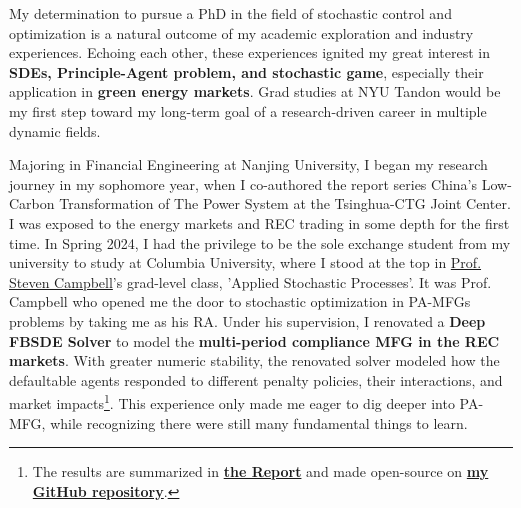 \documentclass[12pt, a4paper]{article}
\newcommand{\Report}{\href{https://github.com/OrangeAoo/Multi-Compliance-MFG-FBSDEs/blob/ca6adb57636c1fc1ff9daea8d57f004e5762fd4d/FinalReports/Report-v3.pdf}{\textbf{the Report}}\xspace}
\newcommand{\GitHubMFG}{\href{https://github.com/OrangeAoo/Multi-Period-Compliance-MFG-FBSDEs}{\textbf{my GitHub repository}}\xspace}
\newcommand{\NJU}{Nanjing University\xspace}
\newcommand{\TCJC}{Tsinghua-CTG Joint Center\xspace}
\newcommand{\CU}{Columbia University\xspace}
\newcommand{\schoolShort}{NYU Tandon\xspace}
\newcommand{\SC}{\href{https://www.stevenacampbell.com/}{Prof. Steven Campbell}\xspace}
\begin{document}


My determination to pursue a PhD in the field of stochastic control and optimization is a natural outcome of my academic exploration and industry experiences. Echoing each other, these experiences ignited my great interest in \textbf{SDEs, Principle-Agent problem, and stochastic game}, especially their application in \textbf{green energy markets}. Grad studies at \schoolShort would be my first step toward my long-term goal of a research-driven career in multiple dynamic fields.

Majoring in Financial Engineering at \NJU, I began my research journey in my sophomore year, when I co-authored the report series China's Low-Carbon Transformation of The Power System at the \TCJC. I was exposed to the energy markets and REC trading in some depth for the first time. In Spring 2024, I had the privilege to be the sole exchange student from my university to study at \CU, where I stood at the top in \SC’s grad-level class, 'Applied Stochastic Processes'. It was Prof. Campbell who opened me the door to stochastic optimization in PA-MFGs problems by taking me as his RA. Under his supervision, I renovated a \textbf{Deep FBSDE Solver} to model the \textbf{multi-period compliance MFG in the REC markets}. With greater numeric stability, the renovated solver modeled how the defaultable agents responded to different penalty policies, their interactions, and market impacts\footnote{The results are summarized in \Report and made open-source on \GitHubMFG.}. This experience only made me eager to dig deeper into PA-MFG, while recognizing there were still many fundamental things to learn.
\end{document}
